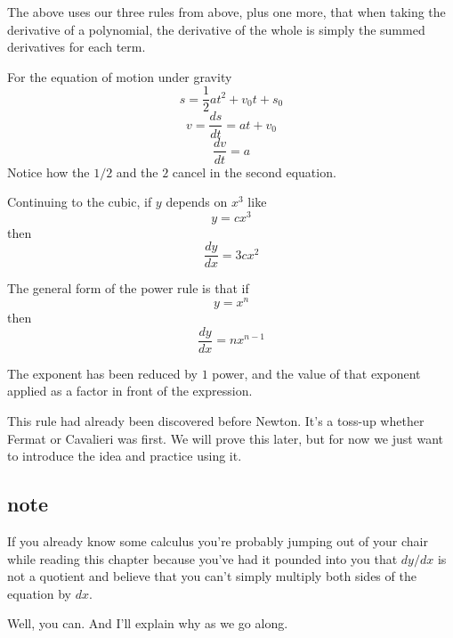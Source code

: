 \documentclass[11pt, oneside]{article}
\begin{document}
The above uses our three rules from above, plus one more, that when taking the derivative of a polynomial, the derivative of the whole is simply the summed derivatives for each term.

For the equation of motion under gravity
\[ s = \frac{1}{2} a t^2 + v_0 t + s_0 \]
\[ v = \frac{ds}{dt} = at + v_0 \]
\[ \frac{dv}{dt} = a \]
Notice how the $1/2$ and the $2$ cancel in the second equation.

Continuing to the cubic, if $y$ depends on $x^3$ like
\[ y = cx^3 \]
then
\[ \frac{dy}{dx} = 3cx^2 \]

The general form of the power rule is that if
\[ y = x^n \]
then
\[ \frac{dy}{dx} = n x^{n-1} \]

The exponent has been reduced by $1$ power, and the value of that exponent applied as a factor in front of the expression.

This rule had already been discovered before Newton.  It's a toss-up whether Fermat or Cavalieri was first.  We will prove this later, but for now we just want to introduce the idea and practice using it.

\subsection*{note}
If you already know some calculus you're probably jumping out of your chair while reading this chapter because you've had it pounded into you that $dy/dx$ is not a quotient and believe that you can't simply multiply both sides of the equation by $dx$.

Well, you can.  And I'll explain why as we go along.
\end{document}
